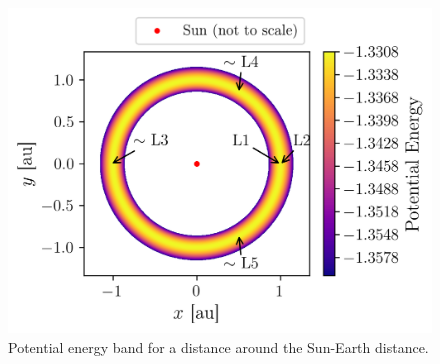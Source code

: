 \begin{figure}[h]
    \centering
    \includegraphics[width=0.6\linewidth]{figures/potential_global.png}
    \caption{Potential energy band for a distance around the Sun-Earth distance.}
    \label{fig:lagrange_potential_global}
\end{figure}



